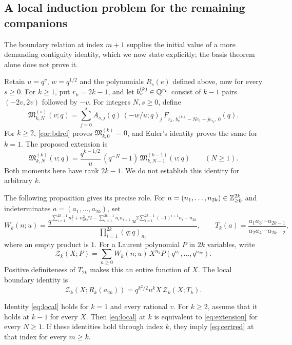 \subsection{A local induction problem for the remaining companions}
The boundary relation at index $m+1$ supplies the initial value of a more demanding contiguity identity, which we now state explicitly; the basis theorem alone does not prove it.

Retain $u=q^v$, $w=q^{1/2}$ and the polynomials $R_s(e)$ defined above, now for every $s\ge0$. For $k\ge1$, put $r_k=2k-1$, and let $b^{(k)}_v\in\mathbb{Q}^{r_k}$ consist of $k-1$ pairs $(-2v,2v)$ followed by $-v$. For integers $N,s\ge0$, define
\begin{equation}\label{eq:moment}
\mathfrak M^{(s)}_{k,N}(v;q)=\sum_{j=0}^sA_{s,j}(q)\,(-w/u;q)_j\,F_{r_k,\,b^{(k)}_v-Ne_1+je_{r_k},\,0}(q).
\end{equation}
For $k\ge2$, \cref{cor:bdrel} proves $\mathfrak M^{(k)}_{k,0}=0$, and Euler's identity proves the same for $k=1$. The proposed extension is
\begin{equation}\label{eq:extension}
\mathfrak M^{(k)}_{k,N}(v;q)=\frac{q^{k-1/2}}u\,(q^{-N}-1)\,\mathfrak M^{(k-1)}_{k,N-1}(v;q)\qquad(N\ge1).
\end{equation}
Both moments here have rank $2k-1$. We do not establish this identity for arbitrary $k$.

The following proposition gives its precise role. For $n=(n_1,\dots,n_{2k})\in\mathbb{Z}_{\ge0}^{2k}$ and indeterminates $a=(a_1,\dots,a_{2k})$, set
\[
W_k(n;u)=\frac{q^{\sum_{i=1}^{2k-1}n_i^2+n_{2k}^2/2-\sum_{i=1}^{2k-1}n_in_{i+1}}\,u^{2\sum_{i=1}^{2k-1}(-1)^{i+1}n_i-n_{2k}}}{\prod_{i=1}^{2k}(q;q)_{n_i}},\qquad T_k(a)=\frac{a_1a_3\cdots a_{2k-1}}{a_2a_4\cdots a_{2k-2}},
\]
where an empty product is $1$. For a Laurent polynomial $P$ in $2k$ variables, write
\[
\mathcal Z_k(X;P)=\sum_{n\ge0}W_k(n;u)\,X^{n_1}P(q^{n_1},\dots,q^{n_{2k}}).
\]
Positive definiteness of $T_{2k}$ makes this an entire function of $X$. The local boundary identity is
\begin{equation}\label{eq:local}
\mathcal Z_k(X;R_k(a_{2k}))=q^{k^2/2}u^kX\,\mathcal Z_k(X;T_k).
\end{equation}

\begin{proposition}\label{prop:induction}
Identity \eqref{eq:local} holds for $k=1$ and every rational $v$. For $k\ge2$, assume that it holds at $k-1$ for every $X$. Then \eqref{eq:local} at $k$ is equivalent to \eqref{eq:extension} for every $N\ge1$. If these identities hold through index $k$, they imply \eqref{eq:certred} at that index for every $m\ge k$.
\end{proposition}

